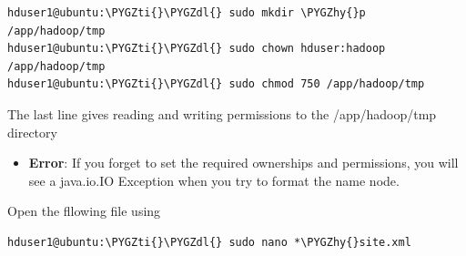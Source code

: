 \documentclass[a4paper,12pt,oneside]{sphinxmanual}
\def\PYGZdl{\char`\$}
\def\PYGZhy{\char`\-}
\def\PYGZti{\char`\~}
\begin{document}
\begin{Verbatim}[commandchars=\\\{\}]
hduser1@ubuntu:\PYGZti{}\PYGZdl{} sudo mkdir \PYGZhy{}p /app/hadoop/tmp
hduser1@ubuntu:\PYGZti{}\PYGZdl{} sudo chown hduser:hadoop /app/hadoop/tmp
hduser1@ubuntu:\PYGZti{}\PYGZdl{} sudo chmod 750 /app/hadoop/tmp
\end{Verbatim}

The last line gives reading and writing permissions to the /app/hadoop/tmp directory
\begin{itemize}
\item {} 
\textbf{Error}: If you forget to set the required ownerships and permissions, you will see a java.io.IO Exception when you try to format the name node.

\end{itemize}

Open the fllowing file using

\begin{Verbatim}[commandchars=\\\{\}]
hduser1@ubuntu:\PYGZti{}\PYGZdl{} sudo nano *\PYGZhy{}site.xml
\end{Verbatim}
\end{document}
